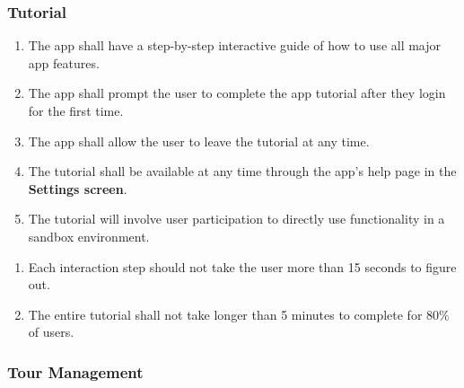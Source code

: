 \documentclass{article}
\begin{document}

\subsubsection{Tutorial}
\label{ssub:tutorial}

\begin{enumerate}[align=left, label=\textbf{TU-FR\arabic*:}]
    \item The app shall have a step-by-step interactive guide of how to use all major app features.
    \item The app shall prompt the user to complete the app tutorial after they login for the first time.
    \item The app shall allow the user to leave the tutorial at any time.
    \item The tutorial shall be available at any time through the app's help page in the \textbf{Settings screen}.
    \item The tutorial will involve user participation to directly use functionality in a sandbox environment.
\end{enumerate}

\begin{enumerate}[align=left, label=\textbf{TU-NFR\arabic*:}]
    \item Each interaction step should not take the user more than 15 seconds to figure out.
    \item The entire tutorial shall not take longer than 5 minutes to complete for 80\% of users.
\end{enumerate}

\subsubsection{Tour Management}
\label{ssub:tour_management}
\end{document}

